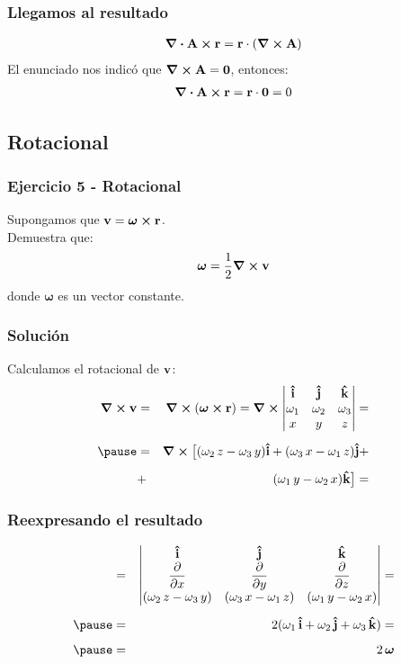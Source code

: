 \documentclass[12pt]{beamer}
\begin{document}
\begin{frame}
\frametitle{Llegamos al resultado}
\begin{align*}
\div{\vb{A} \cp \vb{r}} = \vb{r} \cdot  (\curl{\vb{A}})
\end{align*}
\pause
El enunciado nos indicó que $\curl{\vb{A}} = \vb{0}$, entonces:
\begin{align*}
\div{\vb{A} \cp \vb{r}} = \vb{r} \cdot \vb{0} = 0
\end{align*}
\end{frame}

\subsection{Rotacional}

\begin{frame}
\frametitle{Ejercicio 5 - Rotacional}
Supongamos que $\vb{v} = \bm{\omega} \cp \vb{r}$.
\\
\bigskip
Demuestra que:
\begin{align*}
\bm{\omega} = \dfrac{1}{2} \curl{\vb{v}}
\end{align*}
donde $\bm{\omega}$ es un vector constante.
\end{frame}
\begin{frame}
\frametitle{Solución}
Calculamos el rotacional de $\vb{v}$:
\begin{eqnarray*}
\curl{\vb{v}} &=& \curl{(\bm{\omega} \cp \vb{r})} = \curl{\mqty|
\vu{i} & \vu{j} & \vu{k} \\
\omega_{1} & \omega_{2} & \omega_{3} \\
x & y & z|} = \\[0.5em] \pause
&=& \curl{ \big[ (\omega_{2} \, z - \omega_{3} \, y) \vu{i} + (\omega_{3} \, x - \omega_{1} \, z) \vu{j} + \\[0.5em]
&+& (\omega_{1} \, y - \omega_{2} \, x) \vu{k} \big] } =
\end{eqnarray*}
\end{frame}
\begin{frame}
\frametitle{Reexpresando el resultado}
\begin{eqnarray*}
&=& \mqty|
\vu{i} & \vu{j} & \vu{k} \\
\displaystyle \pdv{x} & \displaystyle \pdv{y} & \displaystyle \pdv{z} \\
(\omega_{2} \, z - \omega_{3} \, y) & (\omega_{3} \, x - \omega_{1} \, z) & (\omega_{1} \, y - \omega_{2} \, x) | = \\[0.5em] \pause
&=& 2 (\omega_{1} \, \vu{i} + \omega_{2} \, \vu{j} + \omega_{3} \, \vu{k}) = \\[0.5em] \pause
&=& 2 \, \bm{\omega}
\end{eqnarray*}
\end{frame}
\end{document}
